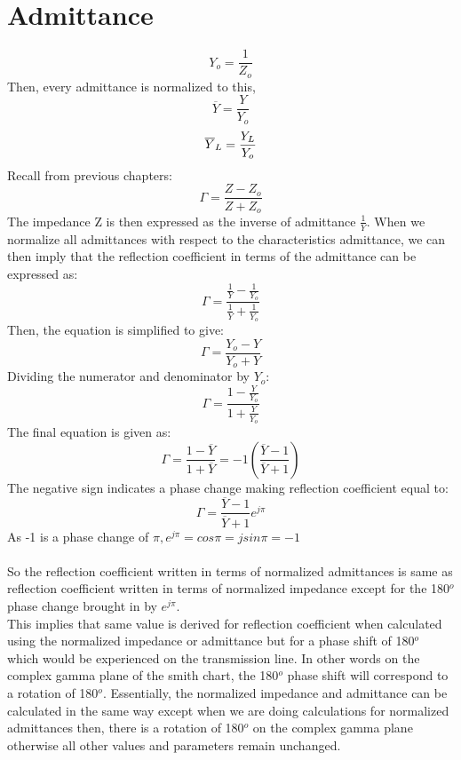 \section{Admittance}
\begin{equation}
Y_o= \frac{1}{Z_o}
\end{equation}
Then, every admittance is normalized to this,
\begin{equation*}
\overline{Y} = \frac{Y}{Y_o} 
\end{equation*}
\begin{equation*}
\space  \overline{Y}_L = \frac{Y_L}{Y_o}
\end{equation*}
Recall from previous chapters:
\begin{equation*}
\Gamma = \frac{Z-Z_o}{Z+Z_o} 
\end{equation*}
The impedance Z is then expressed as the inverse of admittance $\frac{1}{Y}$. When we normalize all admittances with respect to the characteristics admittance, we can then imply that the reflection coefficient in terms of the admittance can be expressed as:
\begin{equation*}
\Gamma = \frac{\frac{1}{Y} - \frac{1}{Y_o}}{\frac{1}{Y} + \frac{1}{Y_o}}
\end{equation*}
Then, the equation is simplified to give:
\begin{equation}
\Gamma= \frac{Y_o - Y}{Y_o + Y} 
\end{equation}
Dividing the numerator and denominator by $Y_o$:
\begin{equation*}
  \Gamma= \frac{1 - \frac{Y}{Y_o}}{1 + \frac{Y}{Y_o}}
\end{equation*}
The final equation is given as:
\begin{equation*}
\Gamma= \frac{1 - \overline{Y}}{1 + \overline{Y}} = -1 (\frac{\overline{Y} - 1}{\overline{Y} + 1}) 
\end{equation*}
The negative sign indicates a phase change making reflection coefficient equal to:
\begin{equation}
 \Gamma = \frac{\overline{Y} - 1}{\overline{Y} + 1}e^{j\pi}
\end{equation}
As -1 is a phase change of $\pi, e^{j\pi} = cos\pi = jsin\pi = -1$\\\\
So the reflection coefficient written in terms of normalized admittances is same as reflection coefficient written in terms of normalized impedance except for the 180$^o$ phase change brought in by $e^{j\pi}$.\\
This implies that same value is derived for reflection coefficient when calculated using the normalized impedance or admittance but for a phase shift of 180$^o$ which would be experienced on the transmission line. In other words on the complex gamma plane of the smith chart, the 180$^o$ phase shift will correspond to a rotation of 180$^o$. Essentially, the normalized impedance and admittance can be calculated in the same way except when we are doing calculations for normalized admittances then, there is a rotation of 180$^o$ on the complex gamma plane otherwise all other values and parameters remain unchanged.
